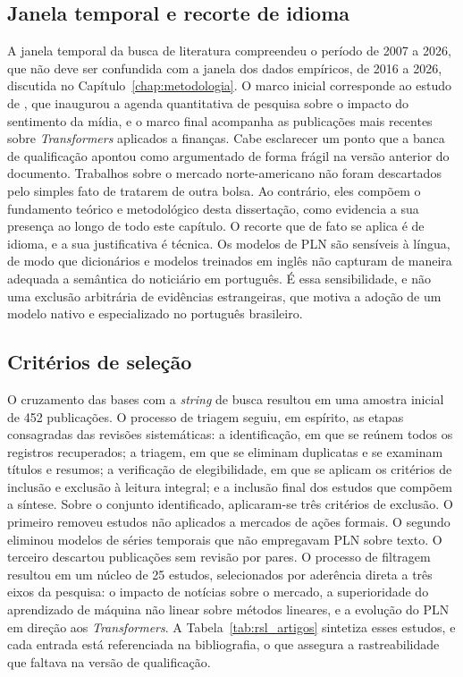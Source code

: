 \subsection{Janela temporal e recorte de idioma}
A janela temporal da busca de literatura compreendeu o período de 2007 a 2026, que não deve ser confundida com a janela dos dados empíricos, de 2016 a 2026, discutida no Capítulo~\ref{chap:metodologia}. O marco inicial corresponde ao estudo de , que inaugurou a agenda quantitativa de pesquisa sobre o impacto do sentimento da mídia, e o marco final acompanha as publicações mais recentes sobre \textit{Transformers} aplicados a finanças. Cabe esclarecer um ponto que a banca de qualificação apontou como argumentado de forma frágil na versão anterior do documento. Trabalhos sobre o mercado norte-americano não foram descartados pelo simples fato de tratarem de outra bolsa. Ao contrário, eles compõem o fundamento teórico e metodológico desta dissertação, como evidencia a sua presença ao longo de todo este capítulo. O recorte que de fato se aplica é de idioma, e a sua justificativa é técnica. Os modelos de PLN são sensíveis à língua, de modo que dicionários e modelos treinados em inglês não capturam de maneira adequada a semântica do noticiário em português. É essa sensibilidade, e não uma exclusão arbitrária de evidências estrangeiras, que motiva a adoção de um modelo nativo e especializado no português brasileiro.

\subsection{Critérios de seleção}
O cruzamento das bases com a \textit{string} de busca resultou em uma amostra inicial de 452 publicações. O processo de triagem seguiu, em espírito, as etapas consagradas das revisões sistemáticas: a identificação, em que se reúnem todos os registros recuperados; a triagem, em que se eliminam duplicatas e se examinam títulos e resumos; a verificação de elegibilidade, em que se aplicam os critérios de inclusão e exclusão à leitura integral; e a inclusão final dos estudos que compõem a síntese. Sobre o conjunto identificado, aplicaram-se três critérios de exclusão. O primeiro removeu estudos não aplicados a mercados de ações formais. O segundo eliminou modelos de séries temporais que não empregavam PLN sobre texto. O terceiro descartou publicações sem revisão por pares. O processo de filtragem resultou em um núcleo de 25 estudos, selecionados por aderência direta a três eixos da pesquisa: o impacto de notícias sobre o mercado, a superioridade do aprendizado de máquina não linear sobre métodos lineares, e a evolução do PLN em direção aos \textit{Transformers}. A Tabela~\ref{tab:rsl_artigos} sintetiza esses estudos, e cada entrada está referenciada na bibliografia, o que assegura a rastreabilidade que faltava na versão de qualificação.

